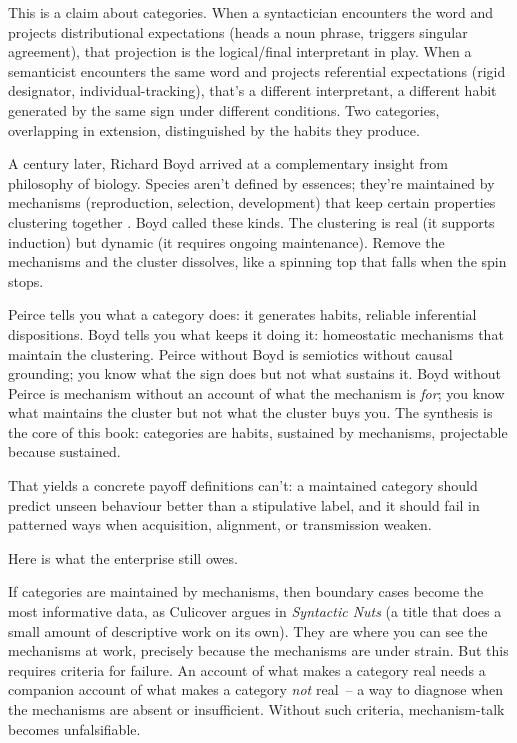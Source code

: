This is a claim about categories. When a syntactician encounters the word  and projects distributional expectations (heads a noun phrase, triggers singular agreement), that projection is the logical/final interpretant in play. When a semanticist encounters the same word and projects referential expectations (rigid designator, individual-tracking), that's a different interpretant, a different habit generated by the same sign under different conditions. Two categories, overlapping in extension, distinguished by the habits they produce.

A century later, Richard Boyd arrived at a complementary insight from philosophy of biology. Species aren't defined by essences; they're maintained by mechanisms (reproduction, selection, development) that keep certain properties clustering together \citep{boyd1991}. Boyd called these  kinds. The clustering is real (it supports induction) but dynamic (it requires ongoing maintenance). Remove the mechanisms and the cluster dissolves, like a spinning top that falls when the spin stops.

Peirce tells you what a category does: it generates habits, reliable inferential dispositions. Boyd tells you what keeps it doing it: homeostatic mechanisms that maintain the clustering. Peirce without Boyd is semiotics without causal grounding; you know what the sign does but not what sustains it. Boyd without Peirce is mechanism without an account of what the mechanism is \emph{for}; you know what maintains the cluster but not what the cluster buys you. The synthesis is the core of this book: categories are habits, sustained by mechanisms, projectable because sustained.

That yields a concrete payoff definitions can't: a maintained category should predict unseen behaviour better than a stipulative label, and it should fail in patterned ways when acquisition, alignment, or transmission weaken.

Here is what the enterprise still owes.

If categories are maintained by mechanisms, then boundary cases become the most informative data, as Culicover \autocite*{culicover1999} argues in \textit{Syntactic Nuts} (a title that does a small amount of descriptive work on its own). They are where you can see the mechanisms at work, precisely because the mechanisms are under strain. But this requires criteria for failure. An account of what makes a category real needs a companion account of what makes a category \emph{not} real~-- a way to diagnose when the mechanisms are absent or insufficient. Without such criteria, mechanism-talk becomes unfalsifiable.

